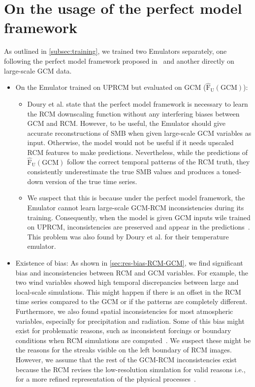 \documentclass[a4paper,11pt,oneside]{report}
\begin{document}
\section{On the usage of the perfect model framework}\label{sec:disc-perfect-model}
As outlined in \autoref{subsec:training}, we trained two Emulators separately, one following the perfect model framework proposed in~\cite{Doury} and another directly on large-scale GCM data. 
\begin{itemize}
    \item On the Emulator trained on UPRCM but evaluated on GCM ($\mathrm{\hat{F}_{U}(GCM)}$): 
    \begin{itemize}
        \item Doury et al. state that the perfect model framework is necessary to learn the RCM downscaling function without any interfering biases between GCM and RCM. However, to be useful, the Emulator should give accurate reconstructions of SMB when given large-scale GCM variables as input. Otherwise, the model would not be useful if it needs upscaled RCM features to make predictions. Nevertheless, while the predictions of $\mathrm{\hat{F}_{U}(GCM)}$ follow the correct temporal patterns of the RCM truth, they consistently underestimate the true SMB values and produces a toned-down version of the true time series.
        \item We suspect that this is because under the perfect model framework, the Emulator cannot learn large-scale GCM-RCM inconsistencies during its training. Consequently, when the model is given GCM inputs wile trained on UPRCM, inconsistencies are preserved and appear in the predictions~\cite{Doury}. This problem was also found by Doury et al. for their temperature emulator. 
    \end{itemize}
    \item Existence of bias: As shown in \autoref{sec:res-bias-RCM-GCM}, we find significant bias and inconsistencies between RCM and GCM variables. For example, the two wind variables showed high temporal discrepancies between large and local-scale simulations. This might happen if there is an offset in the RCM time series compared to the GCM or if the patterns are completely different. Furthermore, we also found spatial inconsistencies for most atmospheric variables, especially for precipitation and radiation. Some of this bias might exist for problematic reasons, such as inconsistent forcings or boundary conditions when RCM simulations are computed~\cite{Doury, Laprise2008ChallengingST}. We suspect these might be the reasons for the streaks visible on the left boundary of RCM images. However, we assume that the rest of the GCM-RCM inconsistencies exist because the RCM revises the low-resolution simulation for valid reasons i.e., for a more refined representation of the physical processes~\cite{Doury}. 

\end{itemize}
\end{document}
